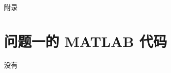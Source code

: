 \newpage
\appendix
{}
{
\begin{center}
    \heiti{} 附\hspace{1pc}录
\end{center}
\section{问题一的 MATLAB 代码}\label{app:1}
没有



}